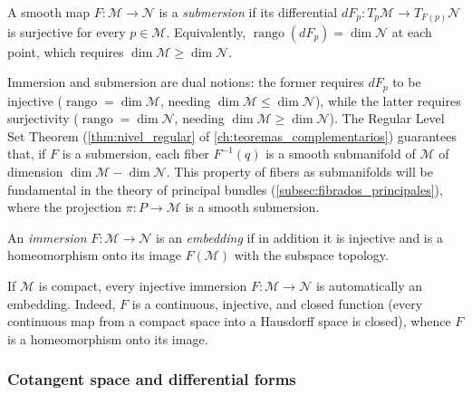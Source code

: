 \begin{definition}\label{def:submersion_suave}
A smooth map $F: \mathcal{M} \to \mathcal{N}$ is a \textit{submersion} if its differential $dF_p: T_p\mathcal{M} \to T_{F(p)}\mathcal{N}$ is surjective for every $p \in \mathcal{M}$. Equivalently, $\operatorname{rango}(dF_p) = \dim \mathcal{N}$ at each point, which requires $\dim \mathcal{M} \geq \dim \mathcal{N}$.
\end{definition}

\begin{remark}\label{rem:inmersion_submersion_dualidad}
Immersion and submersion are dual notions: the former requires $dF_p$ to be injective ($\operatorname{rango} = \dim \mathcal{M}$, needing $\dim \mathcal{M} \leq \dim \mathcal{N}$), while the latter requires surjectivity ($\operatorname{rango} = \dim \mathcal{N}$, needing $\dim \mathcal{M} \geq \dim \mathcal{N}$). The Regular Level Set Theorem (\autoref{thm:nivel_regular} of \autoref{ch:teoremas_complementarios}) guarantees that, if $F$ is a submersion, each fiber $F^{-1}(q)$ is a smooth submanifold of $\mathcal{M}$ of dimension $\dim \mathcal{M} - \dim \mathcal{N}$. This property of fibers as submanifolds will be fundamental in the theory of principal bundles (\autoref{subsec:fibrados_principales}), where the projection $\pi: P \to \mathcal{M}$ is a smooth submersion.
\end{remark}

\begin{definition}\label{def:embebimiento_suave}
An \textit{immersion} $F: \mathcal{M} \to \mathcal{N}$ is an \textit{embedding} if in addition it is injective and is a homeomorphism onto its image $F(\mathcal{M})$ with the subspace topology.
\end{definition}

\begin{remark}\label{rem:compacta_inmersion_embebimiento}
If $\mathcal{M}$ is compact, every injective immersion $F: \mathcal{M} \to \mathcal{N}$ is automatically an embedding. Indeed, $F$ is a continuous, injective, and closed function (every continuous map from a compact space into a Hausdorff space is closed), whence $F$ is a homeomorphism onto its image.
\end{remark}

\subsubsection{Cotangent space and differential forms}\label{subsubsec:espacio_cotangente}

